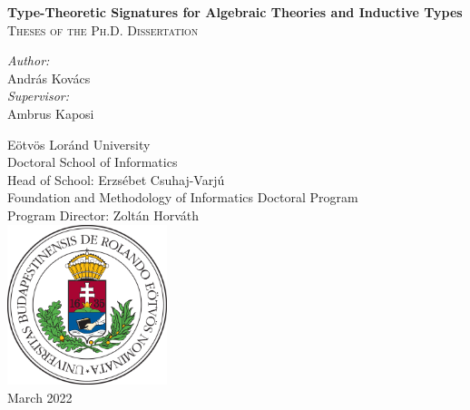 \documentclass[12pt]{article}
\begin{document}
\clearpage

\begin{titlepage}
    \begin{center}
        \vspace*{1cm}

        {\LARGE \textbf{Type-Theoretic Signatures for Algebraic Theories and Inductive Types}}\\
        \vspace{1em}
        {\large \textsc{Theses of the Ph.D. Dissertation}}

        \vspace{2em}

        \textit{Author:}\\
        {\large András Kovács}\\
        \vspace{1em}
        \textit{Supervisor:}\\
        {\large Ambrus Kaposi}

        \vfill
        \vspace{4em}

        {\normalsize
        Eötvös Loránd University\\
        Doctoral School of Informatics\\
        Head of School: Erzsébet Csuhaj-Varjú\\
        Foundation and Methodology of Informatics Doctoral Program\\
        Program Director: Zoltán Horváth\\}
        \vspace{1em}
        \includegraphics[width=0.35\textwidth]{elte_cimer_szines}\\
        \vspace{1em}
        {\large March 2022}

    \end{center}
\end{titlepage}
\thispagestyle{empty}
\end{document}
